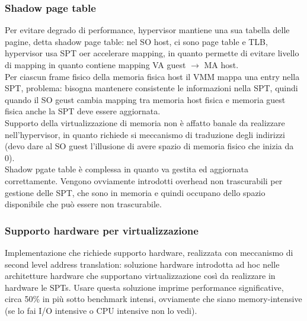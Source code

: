\documentclass[16px]{article}
\begin{document}
\subsubsection{Shadow page table}
Per evitare degrado di performance, hypervisor mantiene una sua tabella delle pagine, detta shadow page table: nel SO host, ci sono page table e TLB, hypervisor usa SPT oer accelerare mapping, in quanto permette di evitare livello di mapping in quanto contiene mapping VA guest $\rightarrow$ MA host.\\ Per ciascun frame fisico della memoria fisica host il VMM mappa una entry nella SPT, problema: bisogna mantenere consistente le informazioni nella SPT, quindi quando il SO geust cambia mapping tra memoria host fisica e memoria guest fisica anche la SPT deve essere aggiornata.\\ Supporto della virtualizzazione di memoria non è affatto banale da realizzare nell'hypervisor, in quanto richiede si meccanismo di traduzione degli indirizzi (devo dare al SO guest l'illusione di avere spazio di memoria fisico che inizia da 0).\\ Shadow pgate table è complessa in quanto va gestita ed aggiornata correttamente. Vengono ovviamente introdotti overhead non trascurabili per gestione delle SPT, che sono in memoria e quindi occupano dello spazio disponibile che può essere non trascurabile.
\subsubsection{Supporto hardware per virtualizzazione}
Implementazione che richiede supporto hardware, realizzata con meccanismo di second level address translation: soluzione hardware introdotta ad hoc nelle architetture hardware che supportano virtualizzazione così da realizzare in hardware le SPTs. Usare questa soluzione imprime performance significative, circa 50\% in più sotto benchmark intensi, ovviamente che siano memory-intensive (se lo fai I/O intensive o CPU intensive non lo vedi).
\end{document}

